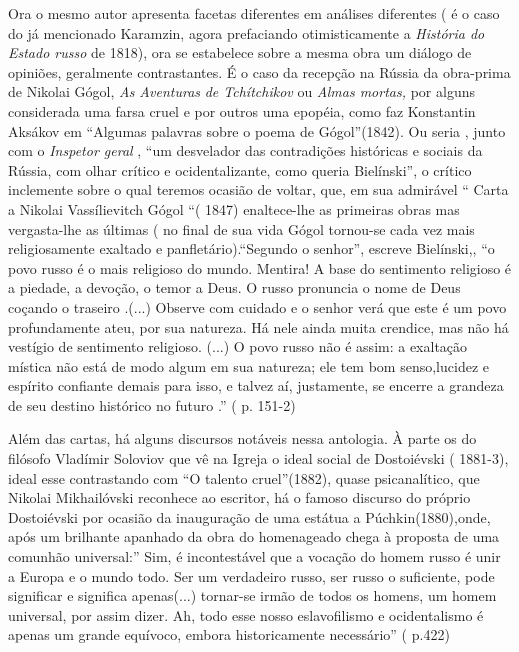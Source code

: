 Ora o mesmo autor apresenta facetas diferentes em análises diferentes (
é o caso do já mencionado Karamzin, agora prefaciando otimisticamente a
\emph{História do Estado russo} de 1818), ora se estabelece sobre a
mesma obra um diálogo de opiniões, geralmente contrastantes. É o caso da
recepção na Rússia da obra-prima de Nikolai Gógol, \emph{As Aventuras}
\emph{de Tchítchikov} ou \emph{Almas mortas,} por alguns considerada uma
farsa cruel e por outros uma epopéia, como faz Konstantin Aksákov em
``Algumas palavras sobre o poema de Gógol''(1842). Ou seria , junto com
o \emph{Inspetor geral} , ``um desvelador das contradições históricas e
sociais da Rússia, com olhar crítico e ocidentalizante, como queria
Bielínski'', o crítico inclemente sobre o qual teremos ocasião de
voltar, que, em sua admirável `` Carta a Nikolai Vassílievitch Gógol ``(
1847) enaltece-lhe as primeiras obras mas vergasta-lhe as últimas ( no
final de sua vida Gógol tornou-se cada vez mais religiosamente exaltado
e panfletário).``Segundo o senhor'', escreve Bielínski,, ``o povo russo
é o mais religioso do mundo. Mentira! A base do sentimento religioso é a
piedade, a devoção, o temor a Deus. O russo pronuncia o nome de Deus
coçando o traseiro .(...) Observe com cuidado e o senhor verá que este é
um povo profundamente ateu, por sua natureza. Há nele ainda muita
crendice, mas não há vestígio de sentimento religioso. (...) O povo
russo não é assim: a exaltação mística não está de modo algum em sua
natureza; ele tem bom senso,lucidez e espírito confiante demais para
isso, e talvez aí, justamente, se encerre a grandeza de seu destino
histórico no futuro .'' ( p. 151-2)

Além das cartas, há alguns discursos notáveis nessa antologia. À parte
os do filósofo Vladímir Soloviov que vê na Igreja o ideal social de
Dostoiévski ( 1881-3), ideal esse contrastando com ``O talento
cruel''(1882), quase psicanalítico, que Nikolai Mikhailóvski reconhece
ao escritor, há o famoso discurso do próprio Dostoiévski por ocasião da
inauguração de uma estátua a Púchkin(1880),onde, após um brilhante
apanhado da obra do homenageado chega à proposta de uma comunhão
universal:'' Sim, é incontestável que a vocação do homem russo é unir a
Europa e o mundo todo. Ser um verdadeiro russo, ser russo o suficiente,
pode significar e significa apenas(...) tornar-se irmão de todos os
homens, um homem universal, por assim dizer. Ah, todo esse nosso
eslavofilismo e ocidentalismo é apenas um grande equívoco, embora
historicamente necessário'' ( p.422)

